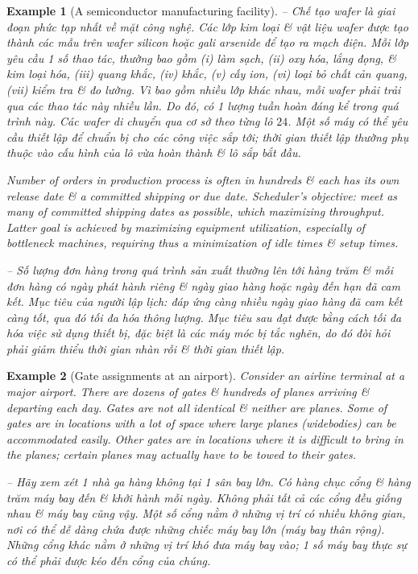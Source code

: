 \documentclass{article}
\newtheorem{example}{Example}
\begin{document}
\begin{itemize}
\begin{itemize}
\begin{example}[A semiconductor manufacturing facility]
            -- Chế tạo wafer là giai đoạn phức tạp nhất về mặt công nghệ. Các lớp kim loại \& vật liệu wafer được tạo thành các mẫu trên wafer silicon hoặc gali arsenide để tạo ra mạch điện. Mỗi lớp yêu cầu 1 số thao tác, thường bao gồm (i) làm sạch, (ii) oxy hóa, lắng đọng, \& kim loại hóa, (iii) quang khắc, (iv) khắc, (v) cấy ion, (vi) loại bỏ chất cản quang, (vii) kiểm tra \& đo lường. Vì bao gồm nhiều lớp khác nhau, mỗi wafer phải trải qua các thao tác này nhiều lần. Do đó, có 1 lượng tuần hoàn đáng kể trong quá trình này. Các wafer di chuyển qua cơ sở theo từng lô $24$. Một số máy có thể yêu cầu thiết lập để chuẩn bị cho các công việc sắp tới; thời gian thiết lập thường phụ thuộc vào cấu hình của lô vừa hoàn thành \& lô sắp bắt đầu.
            
            Number of orders in production process is often in hundreds \& each has its own release date \& a committed shipping or due date. Scheduler's objective: meet as many of committed shipping dates as possible, which maximizing throughput. Latter goal is achieved by maximizing equipment utilization, especially of bottleneck machines, requiring thus a minimization of idle times \& setup times.
            
            -- Số lượng đơn hàng trong quá trình sản xuất thường lên tới hàng trăm \& mỗi đơn hàng có ngày phát hành riêng \& ngày giao hàng hoặc ngày đến hạn đã cam kết. Mục tiêu của người lập lịch: đáp ứng càng nhiều ngày giao hàng đã cam kết càng tốt, qua đó tối đa hóa thông lượng. Mục tiêu sau đạt được bằng cách tối đa hóa việc sử dụng thiết bị, đặc biệt là các máy móc bị tắc nghẽn, do đó đòi hỏi phải giảm thiểu thời gian nhàn rỗi \& thời gian thiết lập.
        \end{example}
        
        \begin{example}[Gate assignments at an airport]
            Consider an airline terminal at a major airport. There are dozens of gates \& hundreds of planes arriving \& departing each day. Gates are not all identical \& neither are planes. Some of gates are in locations with a lot of space where large planes (widebodies) can be accommodated easily. Other gates are in locations where it is difficult to bring in the planes; certain planes may actually have to be towed to their gates.
            
            -- Hãy xem xét 1 nhà ga hàng không tại 1 sân bay lớn. Có hàng chục cổng \& hàng trăm máy bay đến \& khởi hành mỗi ngày. Không phải tất cả các cổng đều giống nhau \& máy bay cũng vậy. Một số cổng nằm ở những vị trí có nhiều không gian, nơi có thể dễ dàng chứa được những chiếc máy bay lớn (máy bay thân rộng). Những cổng khác nằm ở những vị trí khó đưa máy bay vào; 1 số máy bay thực sự có thể phải được kéo đến cổng của chúng.
            

\end{example}
\end{itemize}
\end{itemize}
\end{document}
